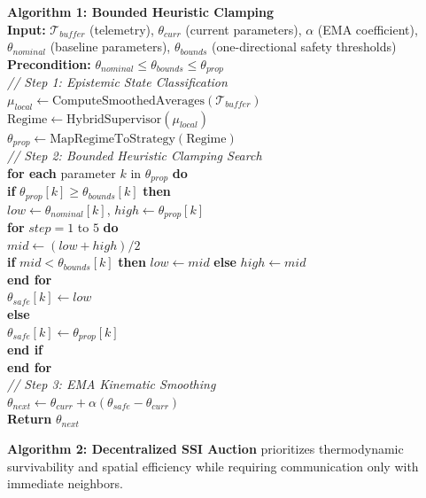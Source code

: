 \documentclass[conference]{IEEEtran}
\begin{document}
\noindent \textbf{Algorithm 1: Bounded Heuristic Clamping} \\
\textbf{Input:} $\mathcal{T}_{buffer}$ (telemetry), $\theta_{curr}$ (current parameters), $\alpha$ (EMA coefficient), $\theta_{nominal}$ (baseline parameters), $\theta_{bounds}$ (one-directional safety thresholds) \\
\textbf{Precondition:} $\theta_{nominal} \le \theta_{bounds} \le \theta_{prop}$ \\
\textit{// Step 1: Epistemic State Classification} \\
$\mu_{local} \leftarrow \text{ComputeSmoothedAverages}(\mathcal{T}_{buffer})$ \\
$\text{Regime} \leftarrow \text{HybridSupervisor}(\mu_{local})$ \\
$\theta_{prop} \leftarrow \text{MapRegimeToStrategy}(\text{Regime})$ \\
\textit{// Step 2: Bounded Heuristic Clamping Search} \\
\textbf{for each} parameter $k$ in $\theta_{prop}$ \textbf{do} \\
\quad \textbf{if} $\theta_{prop}[k] \ge \theta_{bounds}[k]$ \textbf{then} \\
\quad \quad $low \leftarrow \theta_{nominal}[k]$, $high \leftarrow \theta_{prop}[k]$ \\
\quad \quad \textbf{for} $step = 1$ to $5$ \textbf{do} \\
\quad \quad \quad $mid \leftarrow (low + high) / 2$ \\
\quad \quad \quad \textbf{if} $mid < \theta_{bounds}[k]$ \textbf{then} $low \leftarrow mid$ \textbf{else} $high \leftarrow mid$ \\
\quad \quad \textbf{end for} \\
\quad \quad $\theta_{safe}[k] \leftarrow low$ \\
\quad \textbf{else} \\
\quad \quad $\theta_{safe}[k] \leftarrow \theta_{prop}[k]$ \\
\quad \textbf{end if} \\
\textbf{end for} \\
\textit{// Step 3: EMA Kinematic Smoothing} \\
$\theta_{next} \leftarrow \theta_{curr} + \alpha (\theta_{safe} - \theta_{curr})$ \\
\textbf{Return} $\theta_{next}$

\vspace{1em}

\noindent \textbf{Algorithm 2: Decentralized SSI Auction} prioritizes thermodynamic survivability and spatial efficiency while requiring communication only with immediate neighbors.
\end{document}
